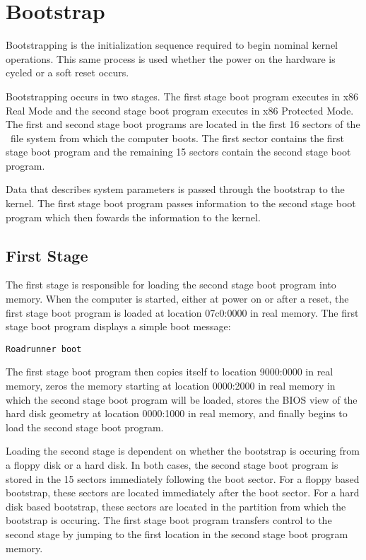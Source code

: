 \chapter{Bootstrap}

Bootstrapping is the initialization sequence required to begin
nominal kernel operations.  This same process is used whether
the power on the hardware is cycled or a soft reset occurs.

Bootstrapping occurs in two stages.  The first stage boot program
executes in x86 Real Mode and the second stage boot program
executes in x86 Protected Mode.  The first and second stage boot
programs are located in the first 16 sectors of the \roadrunner\ 
file system from which the computer boots.  The first sector
contains the first stage boot program and the remaining 15 sectors
contain the second stage boot program.

Data that describes system parameters is passed through the
bootstrap to the kernel.  The first stage boot program passes
information to the second stage boot program which then fowards
the information to the kernel.


\section{First Stage}

The first stage is responsible for loading the second stage boot
program into memory.  When the computer is started, either at power
on or after a reset, the first stage boot program is loaded at
location 07c0:0000 in real memory.  The first stage boot program
displays a simple boot message:

\begin{verbatim}
Roadrunner boot
\end{verbatim}

\noindent The first stage boot program then copies itself to
location 9000:0000 in real memory, zeros the memory starting at
location 0000:2000 in real memory in which the second stage boot
program will be loaded, stores the BIOS view of the hard disk
geometry at location 0000:1000 in real memory, and finally begins
to load the second stage boot program.

Loading the second stage is dependent on whether the bootstrap
is occuring from a floppy disk or a hard disk.  In both cases,
the second stage boot program is stored in the 15 sectors
immediately following the boot sector.  For a floppy based
bootstrap, these sectors are located immediately after the boot
sector.  For a hard disk based bootstrap, these sectors are
located in the partition from which the bootstrap is occuring.
The first stage boot program transfers control to the second
stage by jumping to the first location in the second stage
boot program memory.


